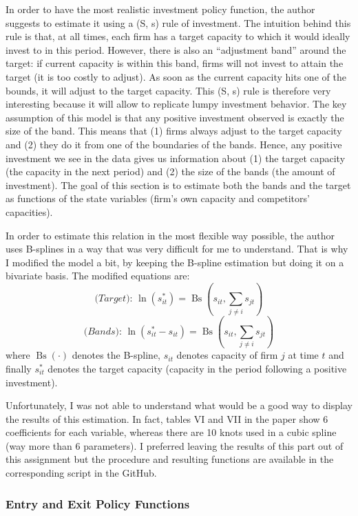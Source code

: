 \documentclass[12pt]{article}
\begin{document}
In order to have the most realistic investment policy function, the author suggests to estimate it using a (S, s) rule of investment. The intuition behind this rule is that, at all times, each firm has a target capacity to which it would ideally invest to in this period. However, there is also an ``adjustment band'' around the target: if current capacity is within this band, firms will not invest to attain the target (it is too costly to adjust). As soon as the current capacity hits one of the bounds, it will adjust to the target capacity. This (S, s) rule is therefore very interesting because it will allow to replicate lumpy investment behavior. The key assumption of this model is that any positive investment observed is exactly the size of the band. This means that (1) firms always adjust to the target capacity and (2) they do it from one of the boundaries of the bands. Hence, any positive investment we see in the data gives us information about (1) the target capacity (the capacity in the next period) and (2) the size of the bands (the amount of investment). The goal of this section is to estimate both the bands and the target as functions of the state variables (firm's own capacity and competitors' capacities).

In order to estimate this relation in the most flexible way possible, the author uses B-splines in a way that was very difficult for me to understand. That is why I modified the model a bit, by keeping the B-spline estimation but doing it on a bivariate basis. The modified equations are: $$\textit{(Target): } \ln(s_{it}^*) = \operatorname{Bs}\left(s_{it}, \sum_{j\neq i} s_{jt}\right) $$
$$\textit{(Bands): } \ln(s_{it}^* - s_{it}) = \operatorname{Bs}\left(s_{it}, \sum_{j\neq i} s_{jt}\right) $$ where $\operatorname{Bs}(\cdot)$ denotes the B-spline, $s_{it}$ denotes capacity of firm $j$ at time $t$ and finally $s_{it}^*$ denotes the target capacity (capacity in the period following a positive investment).

Unfortunately, I was not able to understand what would be a good way to display the results of this estimation. In fact, tables VI and VII in the paper show 6 coefficients for each variable, whereas there are 10 knots used in a cubic spline (way more than 6 parameters). I preferred leaving the results of this part out of this assignment but the procedure and resulting functions are available in the corresponding script in the GitHub.

\subsubsection{Entry and Exit Policy Functions}
\end{document}
